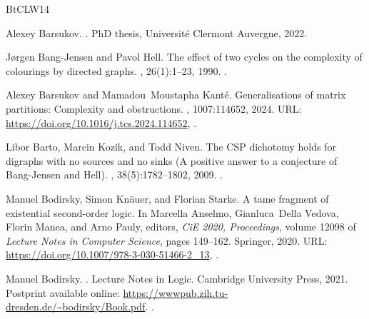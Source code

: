 \documentclass[10pt,a4paper]{amsart}
\theoremstyle{plain}
\theoremstyle{definition}
\numberwithin{equation}{section}
\begin{document}
%
%
%

\begin{thebibliography}{BtCLW14}

Alexey Barsukov.
.
\newblock PhD thesis, Université Clermont Auvergne, 2022.

J{\o}rgen Bang{-}Jensen and Pavol Hell.
\newblock The effect of two cycles on the complexity of colourings by directed graphs.
, 26(1):1--23, 1990.
\newblock \href {https://doi.org/10.1016/0166-218X(90)90017-7} {}.

Alexey Barsukov and Mamadou~Moustapha Kant{\'{e}}.
\newblock Generalisations of matrix partitions: Complexity and obstructions.
, 1007:114652, 2024.
\newblock URL: \url{https://doi.org/10.1016/j.tcs.2024.114652}, \href {https://doi.org/10.1016/J.TCS.2024.114652} {}.

Libor Barto, Marcin Kozik, and Todd Niven.
\newblock The {CSP} dichotomy holds for digraphs with no sources and no sinks {(A} positive answer to a conjecture of {Bang-Jensen} and {Hell}).
, 38(5):1782--1802, 2009.
\newblock \href {https://doi.org/10.1137/070708093} {}.

Manuel Bodirsky, Simon Kn{\"{a}}uer, and Florian Starke.
 {A} tame fragment of existential second-order logic.
\newblock In Marcella Anselmo, Gianluca~Della Vedova, Florin Manea, and Arno Pauly, editors, {\em CiE 2020, Proceedings}, volume 12098 of {\em Lecture Notes in Computer Science}, pages 149--162. Springer, 2020.
\newblock URL: \url{https://doi.org/10.1007/978-3-030-51466-2\_13}, \href {https://doi.org/10.1007/978-3-030-51466-2_13} {}.

Manuel Bodirsky.
.
\newblock Lecture Notes in Logic. Cambridge University Press, 2021.
\newblock Postprint available online: \url{https://wwwpub.zih.tu-dresden.de/~bodirsky/Book.pdf}.
\newblock \href {https://doi.org/10.1017/9781107337534} {}.


\end{thebibliography}
\end{document}
